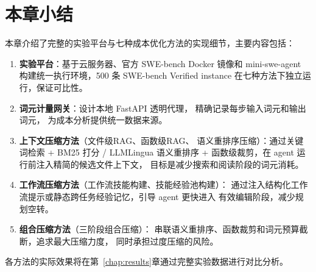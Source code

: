 \section{本章小结}
\label{sec:chap05-summary}

本章介绍了完整的实验平台与七种成本优化方法的实现细节，主要内容包括：

\begin{enumerate}
\item \textbf{实验平台}：基于云服务器、官方 SWE-bench Docker 镜像和
mini-swe-agent 构建统一执行环境，500 条 SWE-bench Verified instance
在七种方法下独立运行，保证可比性。

\item \textbf{词元计量网关}：设计本地 FastAPI 透明代理，
精确记录每步输入词元和输出词元，
为成本分析提供统一数据来源。

\item \textbf{上下文压缩方法}（文件级RAG、函数级RAG、
语义重排序压缩）：通过关键词检索 + BM25 打分 / LLMLingua
语义重排序 + 函数级裁剪，在 agent 运行前注入精简的候选文件上下文，
目标是减少搜索和阅读阶段的词元消耗。

\item \textbf{工作流压缩方法}（工作流技能构建、技能经验池构建）：
通过注入结构化工作流提示或静态跨任务经验记忆，引导 agent 更快进入
有效编辑阶段，减少规划空转。

\item \textbf{组合压缩方法}（三阶段组合压缩）：
串联语义重排序、函数裁剪和词元预算截断，追求最大压缩力度，
同时承担过度压缩的风险。
\end{enumerate}

各方法的实际效果将在第~\ref{chap:results}章通过完整实验数据进行对比分析。